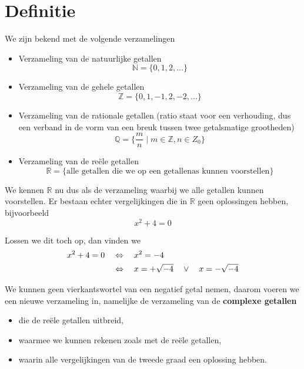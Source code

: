 \documentclass[12pt,twoside,a4]{article}
\begin{document}

\begin{singlespacing}
\tableofcontents
\end{singlespacing}
\thispagestyle{empty}
\pagebreak


\section{Definitie}

We zijn bekend met de volgende verzamelingen
\begin{itemize}
  \item Verzameling van de natuurlijke getallen
  $$\mathbb{N}=\{0, 1, 2, \ldots\}$$
  \item Verzameling van de gehele getallen
  $$\mathbb{Z}=\{0, 1, -1, 2, -2, \ldots\}$$
  \item Verzameling van de rationale getallen (ratio staat voor een verhouding, dus een verband in de vorm van een breuk tussen twee getalsmatige grootheden)
  $$\mathbb{Q}=\{\frac{m}{n}\;|\;m\in\mathbb{Z}, n\in{Z}_0\}$$
  \item Verzameling van de reële getallen
  $$\mathbb{R}=\{\mbox{alle getallen die we op een getallenas kunnen voorstellen}\}$$
\end{itemize}

We kennen $\mathbb{R}$ nu dus als de verzameling waarbij we alle getallen kunnen voorstellen. Er bestaan echter vergelijkingen die in $\mathbb{R}$ geen oplossingen hebben, bijvoorbeeld
$$x^2+4=0$$

Lossen we dit toch op, dan vinden we
\begin{align*}
  x^2+4=0 \quad & \Leftrightarrow\quad x^2 = -4\\
             & \Leftrightarrow\quad x = +\sqrt{-4} \quad\vee\quad x = -\sqrt{-4}
\end{align*}

We kunnen geen vierkantswortel van een negatief getal nemen, daarom voeren we een nieuwe verzameling in, namelijke de verzameling van de {\bf complexe getallen}
\begin{itemize}
  \item die de reële getallen uitbreid,
  \item waarmee we kunnen rekenen zoals met de reële getallen,
  \item waarin alle vergelijkingen van de tweede graad een oplossing hebben.
\end{itemize}
\end{document}
